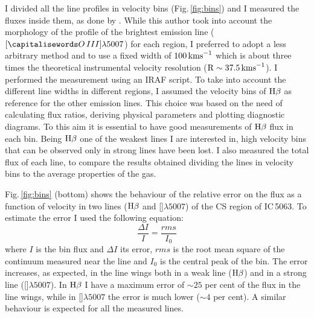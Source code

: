 \documentclass[../main.tex]{subfiles}
\begin{document}
I divided all the line profiles in velocity bins (Fig.\,\ref{fig:bins}) and I measured the fluxes inside them, as done by \citet{Ozaki09}.
While this author took into account the morphology of the profile of the brightest emission line ($[\ion{O}{III}]\lambda5007$) for each region, I preferred to adopt a less arbitrary method and to use a fixed width of $100\,\si{\kms}$ which is about three times the theoretical instrumental velocity resolution ($\rm R\sim 37.5\,\si{\kms}$).
I performed the measurement using an IRAF script. 
To take into account the different line widths in different regions, I assumed the velocity bins of $\Hb$ as reference for the other emission lines. 
This choice was based on the need of calculating flux ratios, deriving physical parameters and plotting diagnostic diagrams. 
To this aim it is essential to have good measurements of $\Hb$ flux in each bin. 
Being $\Hb$ one of the weakest lines I are interested in, high velocity bins that can be observed only in strong lines have been lost.
I also measured the total flux of each line, to compare the results obtained dividing the lines in velocity bins to the average properties of the gas.

Fig.\,\ref{fig:bins} (bottom) shows the behaviour of the relative error on the flux as a function of velocity in two lines ($\Hb$ and []$\lambda5007$) of the CS region of IC\,5063.
To estimate the error I used the following equation:
\begin{equation}
\frac{\Delta I}{I}=\frac{rms}{I_0}
\end{equation}
where $I$ is the bin flux and $\Delta I$ its error, $rms$ is the root mean square of the continuum measured near the line and $I_0$ is the central peak of the bin.
The error increases, as expected, in the line wings both in a weak line ($\Hb$) and in a strong line ([]$\lambda5007$).
In $\Hb$ I have a maximum error of $\sim25$ per cent of the flux in the line wings, while in []$\lambda5007$ the error is much lower ($\sim4$ per cent).
A similar behaviour is expected for all the measured lines.
\end{document}
